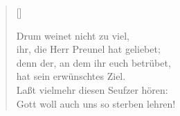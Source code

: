 \begin{center}
\settowidth{\versewidth}{Der, vor dem die Welt erschrickt,}
\begin{verse}[\versewidth]

 Drum weinet nicht zu viel,\\
ihr, die Herr Preunel hat geliebet;\\
denn der, an dem ihr euch betrübet,\\
hat sein erwünschtes Ziel.\\
Laßt vielmehr diesen Seufzer hören:\\
Gott woll auch uns so sterben lehren!
  
\end{verse}
\end{center}




